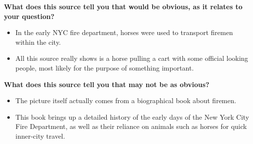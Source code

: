 

\textbf{What does this source tell you that would be obvious, as it relates to your question?}
\begin{itemize}
    \item In the early NYC fire department, horses were used to transport firemen within the city.
    \item All this source really shows is a horse pulling a cart with some official looking people, most likely for the purpose of something important.
    \\
\end{itemize}

\textbf{What does this source tell you that may not be as obvious?}
\begin{itemize}
    \item The picture itself actually comes from a biographical book about firemen.
    \item This book brings up a detailed history of the early days of the New York City Fire Department, as well as their reliance on animals such as horses for quick inner-city travel.
\end{itemize}